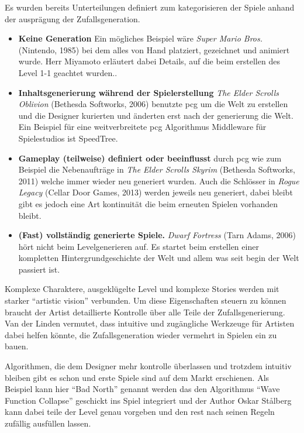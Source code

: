 \documentclass[10pt,a4paper]{article}
\begin{document}
Es wurden bereits Unterteilungen definiert zum kategorisieren der Spiele anhand der ausprägung der Zufallsgeneration\cite{VanderLinden2014}.
\begin{itemize}
\item \textbf{Keine Generation} Ein mögliches Beispiel wäre \textit{Super Mario Bros.} (Nintendo, 1985) bei dem alles von Hand platziert, gezeichnet und animiert wurde. Herr Miyamoto erläutert dabei Details, auf die beim erstellen des Level 1-1 geachtet wurden.\cite{EurogamerMiyamotoInterview}.
\item \textbf{Inhaltsgenerierung während der Spielerstellung} \textit{The Elder Scrolls Oblivion} (Bethesda Softworks, 2006) benutzte \gls{pcg} um die Welt zu erstellen und die Designer kurierten und änderten erst nach der generierung die Welt\cite{PCGamerCarterInterview}. Ein Beispiel für eine weitverbreitete \gls{pcg} Algorithmus Middleware für Spielestudios ist SpeedTree\cite{SpeedTree}.
\item \textbf{Gameplay (teilweise) definiert oder beeinflusst} durch \gls{pcg} wie zum Beispiel die Nebenaufträge in \textit{The Elder Scrolls Skyrim} (Bethesda Softworks, 2011) welche immer wieder neu generiert wurden\cite{Bertz2011}. Auch die Schlösser in \textit{Rogue Legacy} (Cellar Door Games, 2013) werden jeweils neu generiert, dabei bleibt gibt es jedoch eine Art kontinuität die beim erneuten Spielen vorhanden bleibt\cite{Stanton2013}.
\item \textbf{(Fast) vollständig generierte Spiele.} \textit{Dwarf Fortress} (Tarn Adams, 2006) hört nicht beim Levelgenerieren auf. Es startet beim erstellen einer kompletten Hintergrundgeschichte der Welt und allem was seit begin der Welt passiert ist\cite{Champandard2012}.
\end{itemize}

\begin{multicols}{2}
Komplexe Charaktere, ausgeklügelte Level und komplexe Stories werden mit starker “artistic vision” verbunden. Um diese Eigenschaften steuern zu können braucht der Artist detaillierte Kontrolle über alle Teile der Zufallsgenerierung. Van der Linden vermutet, dass intuitive und zugängliche Werkzeuge für Artisten dabei helfen könnte, die Zufallsgeneration wieder vermehrt in Spielen ein zu bauen\cite{VanderLinden2014}.

Algorithmen, die dem Designer mehr kontrolle überlassen und trotzdem intuitiv bleiben gibt es schon und erste Spiele sind auf dem Markt erschienen. Als Beispiel kann hier “Bad North” genannt werden das den Algorithmus “Wave Function Collapse”\cite{Efros1999}\cite{Karth2017} geschickt ins Spiel integriert und der Author Oskar Stålberg kann dabei teile der Level genau vorgeben und den rest nach seinen Regeln zufällig ausfüllen lassen\cite{OskarStalberg2018}.
\end{multicols}
\end{document}
